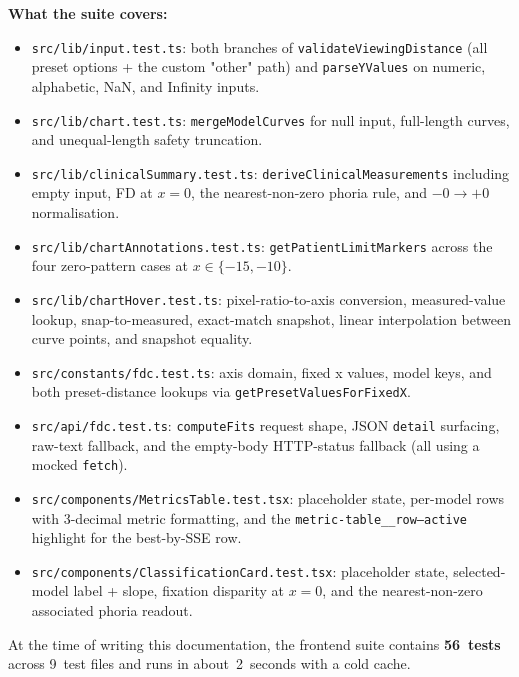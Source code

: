 \documentclass[11pt,a4paper]{article}
\begin{document}
\textbf{What the suite covers:}
\begin{itemize}[leftmargin=1.6em]
  \item \texttt{src/lib/input.test.ts}: both branches of
        \texttt{validateViewingDistance} (all preset options + the custom
        "other" path) and \texttt{parseYValues} on numeric, alphabetic, NaN,
        and Infinity inputs.
  \item \texttt{src/lib/chart.test.ts}: \texttt{mergeModelCurves} for null
        input, full-length curves, and unequal-length safety truncation.
  \item \texttt{src/lib/clinicalSummary.test.ts}:
        \texttt{deriveClinicalMeasurements} including empty input, FD at
        $x=0$, the nearest-non-zero phoria rule, and $-0 \to +0$
        normalisation.
  \item \texttt{src/lib/chartAnnotations.test.ts}:
        \texttt{getPatientLimitMarkers} across the four zero-pattern cases at
        $x \in \{-15, -10\}$.
  \item \texttt{src/lib/chartHover.test.ts}: pixel-ratio-to-axis conversion,
        measured-value lookup, snap-to-measured, exact-match snapshot,
        linear interpolation between curve points, and snapshot equality.
  \item \texttt{src/constants/fdc.test.ts}: axis domain, fixed x values,
        model keys, and both preset-distance lookups via
        \texttt{getPresetValuesForFixedX}.
  \item \texttt{src/api/fdc.test.ts}: \texttt{computeFits} request shape,
        JSON \texttt{detail} surfacing, raw-text fallback, and the
        empty-body HTTP-status fallback (all using a mocked \texttt{fetch}).
  \item \texttt{src/components/MetricsTable.test.tsx}: placeholder state,
        per-model rows with 3-decimal metric formatting, and the
        \texttt{metric-table\_\_row--active} highlight for the best-by-SSE
        row.
  \item \texttt{src/components/ClassificationCard.test.tsx}: placeholder
        state, selected-model label + slope, fixation disparity at $x=0$,
        and the nearest-non-zero associated phoria readout.
\end{itemize}

At the time of writing this documentation, the frontend suite contains
\textbf{56~tests} across 9~test files and runs in about~2~seconds with a
cold cache.
\end{document}

